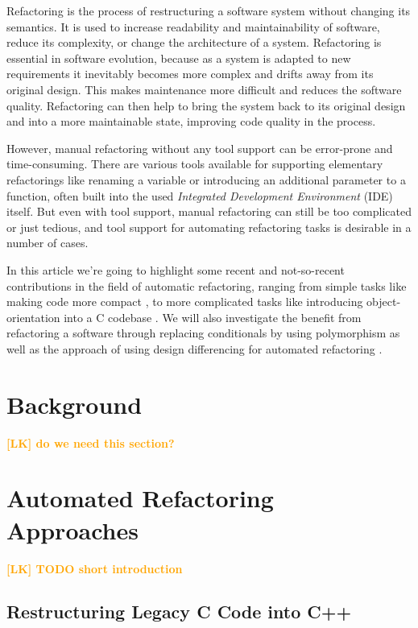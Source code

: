 \documentclass[conference,compsoc,a4paper]{IEEEtran}
\newcommand{\lk}[1]{\textcolor{orange}{\textbf{[LK] #1}}}
\begin{document}
Refactoring is the process of restructuring a software system without changing its semantics. It is used to increase 
readability and maintainability of software, reduce its complexity, or change the architecture of a system. Refactoring 
is essential in software evolution, because as a system is adapted to new requirements it inevitably becomes more 
complex and drifts away from its original design. This makes maintenance more difficult and reduces the software 
quality. Refactoring can then help to bring the system back to its original design and into a more maintainable state, 
improving code quality in the process.

However, manual refactoring without any tool support can be error-prone and time-consuming. There are various tools 
available for supporting elementary refactorings like renaming a variable or introducing an additional parameter to a 
function, often built into the used \emph{Integrated Development Environment} (IDE) itself. But even with tool support, 
manual refactoring can still be too complicated or just tedious, and tool support for automating refactoring tasks is 
desirable in a number of cases.

In this article we're going to highlight some recent and not-so-recent contributions in the field of automatic 
refactoring, ranging from simple tasks like making code more compact \cite{sparta}, to more complicated tasks like 
introducing object-orientation into a C codebase \cite{cpp}. We will also investigate the benefit from refactoring a software through replacing conditionals by using polymorphism \cite{polymorphism} as well as the approach of using design differencing for automated refactoring \cite{design-diff}.

\section{Background}

\lk{do we need this section?}

\section{Automated Refactoring Approaches}

\lk{TODO short introduction}

\subsection{Restructuring Legacy C Code into C++}
\end{document}
